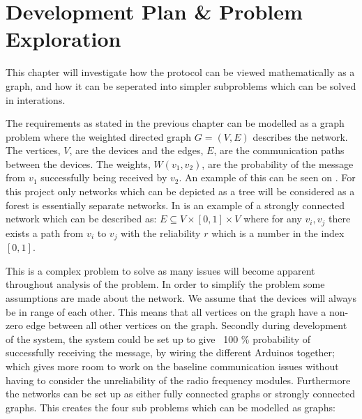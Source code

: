 \chapter{Development Plan \& Problem Exploration}\label{chp:Problems}
This chapter will investigate how the protocol can be viewed mathematically as a graph, and how it can be seperated into simpler subproblems which can be solved in interations.

\noindent The requirements as stated in the previous chapter can be modelled as a graph problem where the weighted directed graph $G = (V, E)$ describes the network. 
The vertices, $V$, are the devices and the edges, $E$, are the communication paths between the devices. 
The weights, $W(v_1, v_2)$, are the probability of the message from $v_1$ successfully being received by $v_2$.
An example of this can be seen on .
For this project only networks which can be depicted as a tree will be considered as a forest is essentially separate networks.
In  is an example of a strongly connected network which can be described as: $E \subseteq V \times [0,1] \times V$ where for any $v_i, v_j$ there exists a path from $v_i$ to $v_j$ with the reliability $r$ which is a number in the index $[0,1]$.


\noindent This is a complex problem to solve as many issues will become apparent throughout analysis of the problem.
In order to simplify the problem some assumptions are made about the network.
We assume that the devices will always be in range of each other.
This means that all vertices on the graph have a non-zero edge between all other vertices on the graph.
Secondly during development of the system, the system could be set up to give ~100 \% probability of successfully receiving the message, by wiring the different Arduinos together; which gives more room to work on the baseline communication issues without having to consider the unreliability of the radio frequency modules.
Furthermore the networks can be set up as either fully connected graphs or strongly connected graphs.
This creates the four sub problems which can be modelled as graphs:  %

